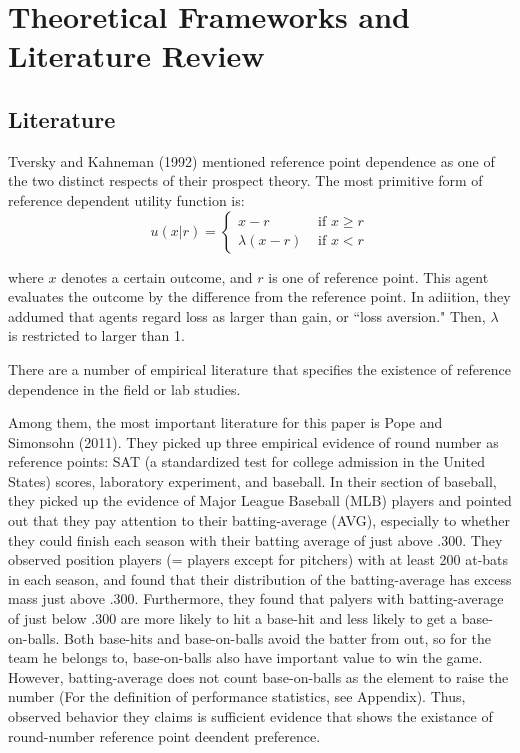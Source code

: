 \documentclass[dvipdfmx, 12pt]{article}
\begin{document}
\section{Theoretical Frameworks and Literature Review}

 \subsection{Literature}

  Tversky and Kahneman (1992) mentioned reference point dependence
  as one of the two distinct respects of their prospect theory.
  The most primitive form of reference dependent utility function is:
  \[
  u(x | r) = \begin{cases}
  x - r & \text{ if }x \geq r \\
  \lambda (x - r) & \text{ if }x < r
\end{cases}
  \]

  where $x$ denotes a certain outcome, and $r$ is one of
  reference point. This agent evaluates the outcome by the
  difference from the reference point. In adiition, they
  addumed that agents regard loss as larger than gain,
  or ``loss aversion." Then, $\lambda$ is restricted to larger than 1.

  There are a number of empirical literature that specifies the existence
  of reference dependence in the field or lab studies.

  Among them, the most important literature for this paper is Pope and
  Simonsohn (2011). They picked up three empirical evidence of round number
  as reference points: SAT (a standardized test for college admission in the
  United States) scores, laboratory experiment, and baseball.
  In their section of baseball, they picked up the evidence of
  Major League Baseball (MLB) players and pointed out that they pay attention
  to their batting-average (AVG), especially to whether they could finish
  each season with their batting average of just above .300.
  They observed position players (= players except for pitchers) with at
  least 200 at-bats in each season, and found that their distribution
  of the batting-average has excess mass just above .300.
  Furthermore, they found that palyers with batting-average of just below
  .300 are more likely to hit a base-hit and less likely to get a
  base-on-balls.
  Both base-hits and base-on-balls avoid the batter from out, so for the
  team he belongs to, base-on-balls also have important value to win the
  game. However, batting-average does not count base-on-balls as the
  element to raise the number (For the definition of performance
  statistics, see Appendix). Thus, observed behavior they claims is
  sufficient evidence that shows the existance of round-number reference
  point deendent preference.
\end{document}

